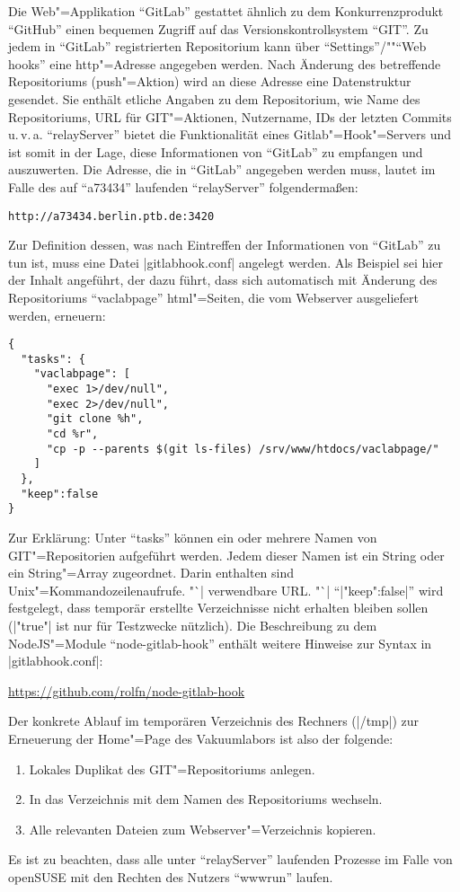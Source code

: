 \documentclass[titlepage=false,toc=nobibliography]{vl-report}
\newcommand*\theServer{relayServer}
\begin{document}
\bigskip

\noindent Die Web"=Applikation "`GitLab"' gestattet ähnlich zu dem Konkurrenzprodukt
"`GitHub"' einen bequemen Zugriff auf das Versionskontrollsystem "`GIT"'. Zu
jedem  in "`GitLab"' registrierten Repositorium kann über
"`Settings"'/"""`Web hooks"' eine http"=Adresse angegeben werden. Nach
Änderung des betreffende Repositoriums (push"=Aktion) wird an diese Adresse
eine Datenstruktur gesendet. Sie enthält etliche Angaben zu dem
Repositorium, wie Name des Repositoriums, URL für GIT"=Aktionen, Nutzername,
IDs der letzten Commits u.\,v.\,a. "`\theServer"' bietet die
Funktionalität eines Gitlab"=Hook"=Servers und ist somit in der Lage, diese
Informationen von "`GitLab"' zu empfangen und auszuwerten. Die Adresse, die
in "`GitLab"' angegeben werden muss, lautet im Falle des auf "`a73434"'
laufenden "`\theServer"' folgendermaßen:
\begin{lstlisting}[language={}]
  http://a73434.berlin.ptb.de:3420
\end{lstlisting}
Zur Definition dessen, was nach Eintreffen der
Informationen von "`GitLab"' zu tun ist, muss eine Datei |gitlabhook.conf|
angelegt werden. Als Beispiel sei hier der Inhalt angeführt, der dazu führt,
dass sich automatisch mit Änderung des Repositoriums "`vaclabpage"'
html"=Seiten, die vom Webserver ausgeliefert werden, erneuern:
\begin{lstlisting}[language={}]
{
  "tasks": {
    "vaclabpage": [
      "exec 1>/dev/null",
      "exec 2>/dev/null",
      "git clone %h",
      "cd %r",
      "cp -p --parents $(git ls-files) /srv/www/htdocs/vaclabpage/"
    ]
  },
  "keep":false
}
\end{lstlisting}%
%
Zur Erklärung: Unter "`tasks"' können ein oder mehrere Namen von
GIT"=Repositorien aufgeführt werden. Jedem dieser Namen ist ein String oder
ein String"=Array zugeordnet. Darin enthalten sind Unix"=Kommandozeilenaufrufe.
"`|%
verwendbare URL. "`|%
"`|"keep":false|"' wird festgelegt, dass temporär erstellte Verzeichnisse
nicht erhalten bleiben sollen (|"true"| ist nur für Testzwecke nützlich). Die
Beschreibung zu dem NodeJS"=Module "`node-gitlab-hook"' enthält weitere
Hinweise zur Syntax in |gitlabhook.conf|: \par\smallskip
\url{https://github.com/rolfn/node-gitlab-hook} \par\smallskip
\noindent
Der konkrete Ablauf im temporären Verzeichnis des Rechners
(|/tmp|) zur Erneuerung der Home"=Page des Vakuumlabors ist also der
folgende:
\begin{enumerate}
  \item Lokales Duplikat des GIT"=Repositoriums anlegen.
  \item In das Verzeichnis mit dem Namen des Repositoriums wechseln.
  \item Alle relevanten Dateien zum Webserver"=Verzeichnis kopieren.
\end{enumerate}
Es ist zu beachten, dass alle unter "`\theServer"' laufenden Prozesse
im Falle von openSUSE mit den Rechten des Nutzers "`wwwrun"' laufen.
\end{document}
